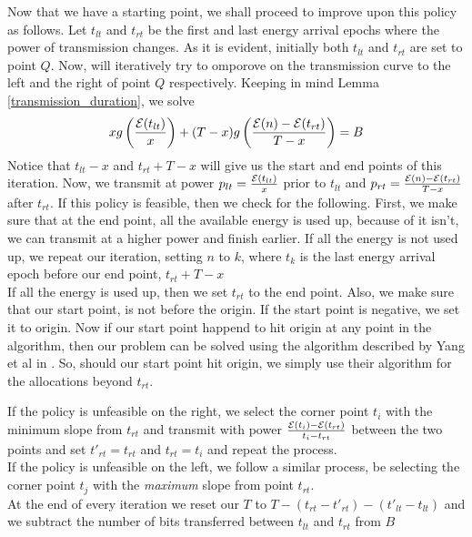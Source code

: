 Now that we have a starting point, we shall proceed to improve upon this policy as follows. Let $t_{lt}$ and $t_{rt}$ be the first and last energy arrival epochs where the power of transmission changes. 
As it is evident, initially both $t_{lt}$ and $t_{rt}$ are set to point $Q$. Now, will iteratively try to omporove on the transmission curve to the left and the right of point $Q$ respectively. 
Keeping in mind Lemma \ref{transmission_duration}, we solve 
\begin{align}
xg\left(\frac{\mathcal{E}(t_{lt})}{x}\right) + (T-x)g\left(\frac{\mathcal{E}(n)-\mathcal{E}(t_{rt})}{T-x}\right) = B
\end{align}
Notice that $t_{lt} - x$ and $t_{rt} + T-x$ will give us the start and end points of this iteration. Now, we transmit at power $p_{lt} = \frac{\mathcal{E}(t_{lt})}{x}$ prior to $t_{lt}$ and $p_{rt} = \frac{\mathcal{E}(n) - \mathcal{E}(t_{rt})}{T-x}$ after $t_{rt}$. 
If this policy is feasible, then we check for the following. First, we make sure that at the end point, all the available energy is used up, because of it isn't, we can transmit at a higher power and finish earlier. 
If all the energy is not used up, we repeat our iteration, setting $n$ to $k$, where $t_k$ is the last energy arrival epoch before our end point, $t_{rt} + T-x$  \\
If all the energy is used up, then we set $t_{rt}$ to the end point. 
Also, we make sure that our start point, is not before the origin. If the start point is negative, we set it to origin. Now if our start point happend to hit origin at any point in the algorithm, then our problem can be 
solved using the algorithm described by Yang et al in \cite{Yang}. So, should our start point hit origin, we simply use their algorithm for the allocations beyond $t_{rt}$.

If the policy is unfeasible on the right, we select the corner point $t_i$ with the minimum slope from $t_{rt}$ and transmit with power $\frac{\mathcal{E}(t_i) - \mathcal{E}(t_{rt})}{t_i-t_{rt}}$ between the two points and set $t'_{rt} = t_{rt}$ and $t_{rt} = t_i$ and repeat the process.\\
If the policy is unfeasible on the left, we follow a similar process, be selecting the corner point $t_j$ with the \textit{maximum} slope from point $t_{rt}$.\\
At the end of every iteration we reset our $T$ to $ T - (t_{rt} - t'_{rt}) - (t'_{lt} - t_{lt})$ and we subtract the number of bits transferred between $t_{lt}$ and $t_{rt}$ from $B$



